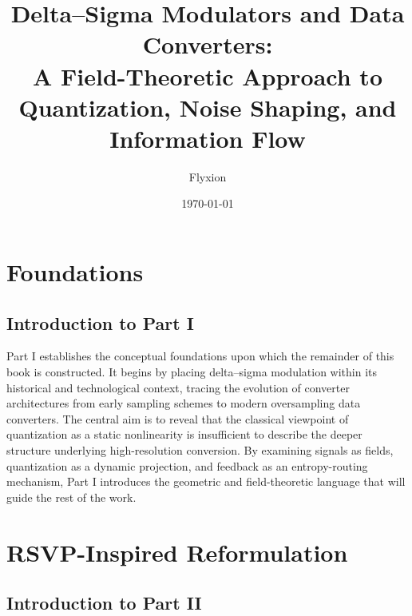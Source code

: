 \documentclass[12pt,oneside]{book}
\title{
\Huge Delta--Sigma Modulators and Data Converters:\\[6pt]
\Large A Field-Theoretic Approach to Quantization, Noise Shaping, and Information Flow
}
\author{Flyxion}
\date{\today}
\theoremstyle{definition}
\theoremstyle{plain}
\begin{document}
\frontmatter
\maketitle
\tableofcontents

\mainmatter


\part{Foundations}

\chapter*{Introduction to Part I}

Part I establishes the conceptual foundations upon which the remainder of this book is constructed. It begins by placing delta--sigma modulation within its historical and technological context, tracing the evolution of converter architectures from early sampling schemes to modern oversampling data converters. The central aim is to reveal that the classical viewpoint of quantization as a static nonlinearity is insufficient to describe the deeper structure underlying high-resolution conversion. By examining signals as fields, quantization as a dynamic projection, and feedback as an entropy-routing mechanism, Part I introduces the geometric and field-theoretic language that will guide the rest of the work.






\part{RSVP-Inspired Reformulation}

\chapter*{Introduction to Part II}
\end{document}
